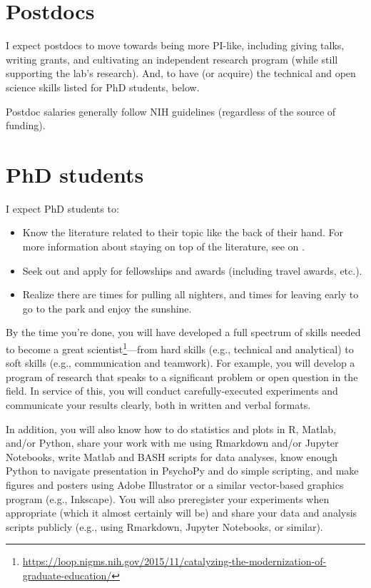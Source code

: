 \documentclass[letterpaper,12pt,oneside]{memoir}
\begin{document}
\section{Postdocs}

I expect postdocs to move towards being more PI-like, including giving talks, writing grants, and cultivating an independent research program (while still supporting the lab's research). And, to have (or acquire) the technical and open science skills listed for PhD students, below.


Postdoc salaries generally follow NIH guidelines (regardless of the source of funding).

\section{PhD students}

I expect PhD students to:

\begin{itemize}
\item Know the literature related to their topic like the back of their hand. For more information about staying on top of the literature, see  on .
\item Seek out and apply for fellowships and awards (including travel awards, etc.).
\item Realize there are times for pulling all nighters, and times for leaving early to go to the park and enjoy the sunshine.
\end{itemize}

By the time you're done, you will have developed a full spectrum of skills needed to become a great scientist\footnote{\url{https://loop.nigms.nih.gov/2015/11/catalyzing-the-modernization-of-graduate-education/}}---from hard skills (e.g., technical and analytical) to soft skills (e.g., communication and teamwork). For example, you will develop a program of research that speaks to a significant problem or open question in the field. In service of this, you will conduct carefully-executed experiments and communicate your results clearly, both in written and verbal formats. 

In addition, you will also know how to do statistics and plots in R, Matlab, and/or Python, share your work with me using Rmarkdown and/or Jupyter Notebooks, write Matlab and BASH scripts for data analyses, know enough Python to navigate presentation in PsychoPy and do simple scripting, and make figures and posters using Adobe Illustrator or a similar vector-based graphics program (e.g., Inkscape). You will also preregister your experiments when appropriate (which it almost certainly will be) and share your data and analysis scripts publicly (e.g., using Rmarkdown, Jupyter Notebooks, or similar). 
\end{document}
